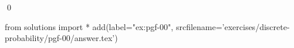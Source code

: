 
\begin{ex} 
  \label{ex:pgf-00}
  
  \qed
\end{ex} 
\begin{python0}
from solutions import *
add(label="ex:pgf-00",
    srcfilename='exercises/discrete-probability/pgf-00/answer.tex') 
\end{python0}
